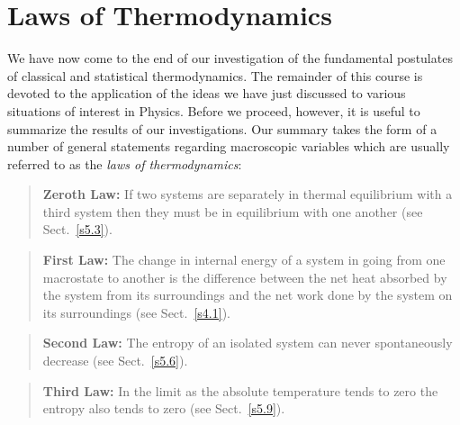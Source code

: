 \section{Laws of Thermodynamics}
We have now come to the end of our investigation of the fundamental postulates of
classical and statistical thermodynamics. The remainder of this course is
devoted to the application of the ideas  we have just discussed to various situations of
interest in Physics. Before we proceed, however, it is useful to summarize the
results of our investigations. Our summary takes the form of a number of
general statements regarding macroscopic variables
 which are usually referred to as the {\em laws of thermodynamics}:

\begin{quote}
{\bf Zeroth Law:} {\sf If two systems are separately 
in thermal equilibrium with a third
system  then they must be in equilibrium with one another} (see Sect.~\ref{s5.3}).
\end{quote}

\begin{quote}
{\bf First Law:} {\sf The change in internal energy of a system in going from one 
macrostate to another is the difference between the net heat absorbed 
by the system from its surroundings and the
net work done by the system on its surroundings} (see Sect.~\ref{s4.1}).
\end{quote}

\begin{quote}
{\bf Second Law:} {\sf The entropy of an isolated system can never spontaneously
decrease} (see Sect.~\ref{s5.6}). 
\end{quote} 

\begin{quote}
{\bf Third Law:} 
{\sf In the limit as the absolute temperature tends to zero the entropy  
also tends to zero} (see Sect.~\ref{s5.9}).
\end{quote} 

